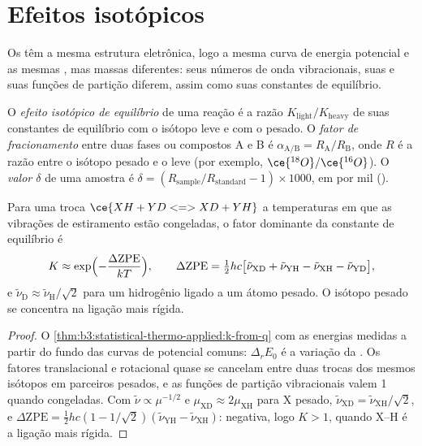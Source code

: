 \section{Efeitos isotópicos}

Os  têm a mesma estrutura eletrônica, logo a mesma curva de energia
potencial e as mesmas , mas massas diferentes: seus números de
onda vibracionais, suas  e suas funções de partição diferem,
assim como suas constantes de equilíbrio.

\begin{definition}\label{def:b3:statistical-thermo-applied:isotope-effect}
O \emph{efeito isotópico de equilíbrio} de uma
reação é a razão $K_{\mathrm{light}}/K_{\mathrm{heavy}}$ de suas constantes de equilíbrio com o
isótopo leve e com o pesado. O \emph{fator de fracionamento}
entre duas fases ou compostos A e B é $\alpha_{\mathrm{A/B}} = R_{\mathrm A}/R_{\mathrm B}$, onde
$R$ é a razão entre o isótopo pesado e o leve (por exemplo, $\ce{^{18}O}/\ce{^{16}O}$). O
\emph{valor $\delta$} de uma amostra é $\delta = (R_{\mathrm{sample}}/R_{\mathrm{standard}}
- 1) \times 1000$, em por mil (\textperthousand).
\end{definition}

\begin{proposition}\label{prop:b3:statistical-thermo-applied:zpe-isotope}
Para uma troca $\ce{XH + YD <=> XD + YH}$ a temperaturas em que as vibrações de
estiramento estão congeladas, o fator dominante da constante de equilíbrio é
\[
  K \approx \exp\Bigl(-\frac{\Delta\mathrm{ZPE}}{kT}\Bigr), \qquad
  \Delta\mathrm{ZPE} = \tfrac12hc\bigl[\tilde\nu_{\mathrm{XD}} + \tilde\nu_{\mathrm{YH}} - \tilde\nu_{\mathrm{XH}} - \tilde\nu_{\mathrm{YD}}\bigr],
\]
e $\tilde\nu_{\mathrm D} \approx \tilde\nu_{\mathrm H}/\sqrt2$ para um hidrogênio ligado a um átomo pesado. O isótopo
pesado se concentra na ligação mais rígida.
\end{proposition}

\begin{proof}
O \cref{thm:b3:statistical-thermo-applied:k-from-q} com as energias medidas a
partir do fundo das curvas de potencial comuns: $\Delta_rE_0$ é a variação da
. Os fatores translacional e rotacional quase se cancelam
entre duas trocas dos mesmos isótopos em parceiros pesados, e as funções de
partição vibracionais valem 1 quando congeladas. Com $\tilde\nu \propto \mu^{-1/2}$ e
$\mu_{\mathrm{XD}} \approx 2\mu_{\mathrm{XH}}$ para X pesado, $\tilde\nu_{\mathrm{XD}} = \tilde\nu_{\mathrm{XH}}/\sqrt2$, e $\Delta\mathrm{ZPE} =
\frac12hc(1 - 1/\sqrt2)(\tilde\nu_{\mathrm{YH}} - \tilde\nu_{\mathrm{XH}})$: negativa, logo $K > 1$, quando X--H é a
ligação mais rígida.
\end{proof}

